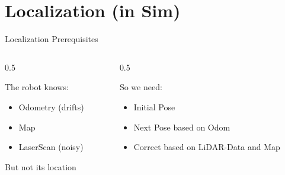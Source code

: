 \documentclass[aspectratio=169, 11pt]{beamer}
\newcommand{\fullsectiontitle}{}
\newcommand{\presentationsection}[2][]{%
  \gdef\fullsectiontitle{#2}%
  \section[#1]{#2}%
}
\begin{document}
\presentationsection[Localization (in Sim)]{Localization (in Sim)}
\begin{frame}{Localization Prerequisites}
  \begin{columns}[T]
    \begin{column}{0.5\textwidth}
      \begin{block}{The robot knows:}
          \begin{itemize}
            \item Odometry (drifts)
            \item Map
            \item LaserScan (noisy)
          \end{itemize}
          But not its location
      \end{block}
    \end{column}
    
    \begin{column}{0.5\textwidth}
      \begin{block}{So we need:}
          \begin{itemize}
            \item Initial Pose
            \item Next Pose based on Odom
            \item Correct based on LiDAR-Data and Map
          \end{itemize}
      \end{block}
    \end{column}
  \end{columns}
\end{frame}
\end{document}

